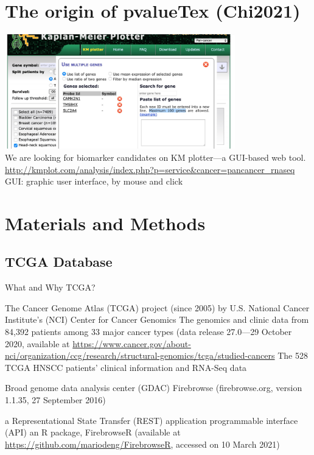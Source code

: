 \documentclass[
paper=landscape,
paper=160mm:90mm, %
fontsize=11pt, %
pagesize, %
parskip=half-, %
]{scrartcl} %
\theoremstyle{mythmstyle} %
\begin{document}
\clearpage
\section{The origin of pvalueTex (Chi2021)}

\includegraphics[width=10cm]{KM_plotter2021.jpg}\\
We are looking for biomarker candidates on KM plotter---a GUI-based web tool.\\
{\tiny \url{http://kmplot.com/analysis/index.php?p=service&cancer=pancancer_rnaseq}\\
GUI: graphic user interface, by mouse and click}

\clearpage
%
\section{Materials and Methods} %

\subsection{TCGA Database}
What and Why TCGA?
\begin{outline}
\1 The Cancer Genome Atlas (TCGA) project (since 2005)
\2 by U.S. National Cancer Institute’s (NCI) Center for Cancer Genomics
\1 The genomics and clinic data from 84,392 patients among 33 major cancer types (data release 27.0—29 October 2020, available at \url{https://www.cancer.gov/about-nci/organization/ccg/research/structural-genomics/tcga/studied-cancers}
\2 The 528 TCGA HNSCC patients’ clinical information and RNA-Seq data

\clearpage

\1 Broad genome data analysis center (GDAC) Firebrowse (firebrowse.org, version 1.1.35, 27 September 2016)

\2 a Representational State Transfer (REST) application programmable interface (API)
\2 an R package, FirebrowseR (available at \url{https://github.com/mariodeng/FirebrowseR}, accessed on 10 March 2021)
\end{outline}
\end{document}
